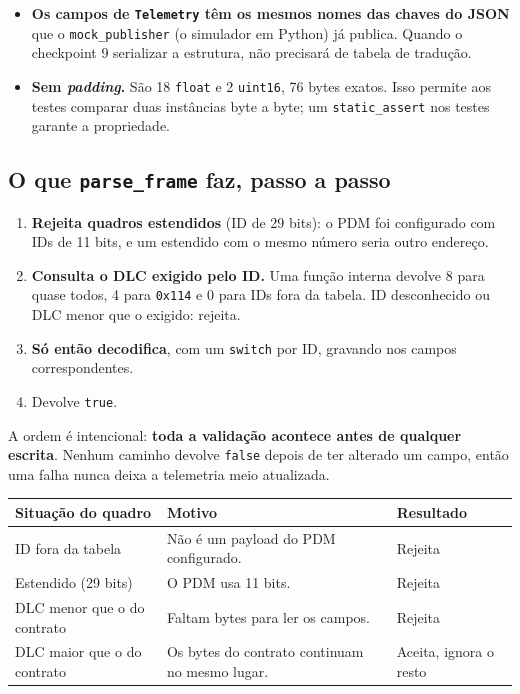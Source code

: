\documentclass[11pt,a4paper]{article}
\begin{document}
\begin{itemize}
    \item \textbf{Os campos de \texttt{Telemetry} têm os mesmos nomes das chaves do JSON} que o \texttt{mock\_publisher} (o simulador em Python) já publica. Quando o checkpoint 9 serializar a estrutura, não precisará de tabela de tradução.
    \item \textbf{Sem \emph{padding}.} São 18 \texttt{float} e 2 \texttt{uint16}, 76 bytes exatos. Isso permite aos testes comparar duas instâncias byte a byte; um \texttt{static\_assert} nos testes garante a propriedade.
\end{itemize}

\subsection{O que \texttt{parse\_frame} faz, passo a passo}

\begin{enumerate}
    \item \textbf{Rejeita quadros estendidos} (ID de 29 bits): o PDM foi configurado com IDs de 11 bits, e um estendido com o mesmo número seria outro endereço.
    \item \textbf{Consulta o DLC exigido pelo ID.} Uma função interna devolve 8 para quase todos, 4 para \texttt{0x114} e 0 para IDs fora da tabela. ID desconhecido ou DLC menor que o exigido: rejeita.
    \item \textbf{Só então decodifica}, com um \texttt{switch} por ID, gravando nos campos correspondentes.
    \item Devolve \texttt{true}.
\end{enumerate}

A ordem é intencional: \textbf{toda a validação acontece antes de qualquer escrita}. Nenhum caminho devolve \texttt{false} depois de ter alterado um campo, então uma falha nunca deixa a telemetria meio atualizada.

\begin{center}
\begin{tabularx}{\textwidth}{lXl}
\toprule
\textbf{Situação do quadro} & \textbf{Motivo} & \textbf{Resultado} \\
\midrule
ID fora da tabela & Não é um payload do PDM configurado. & Rejeita \\
Estendido (29 bits) & O PDM usa 11 bits. & Rejeita \\
DLC menor que o do contrato & Faltam bytes para ler os campos. & Rejeita \\
DLC maior que o do contrato & Os bytes do contrato continuam no mesmo lugar. & Aceita, ignora o resto \\
\bottomrule
\end{tabularx}
\end{center}
\end{document}

